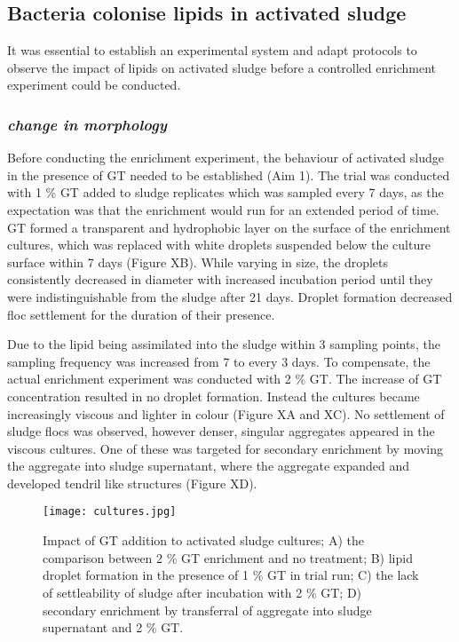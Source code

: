 \documentclass[11pt]{article}
\begin{document}
\subsection{Bacteria colonise lipids in activated sludge}
It was essential to establish an experimental system and adapt protocols to observe the impact of lipids on activated sludge before a controlled enrichment experiment could be conducted. 

\subsubsection{\emph{change in morphology}}
Before conducting the enrichment experiment, the behaviour of activated sludge in  the presence of GT needed to be established (Aim 1). The trial was conducted with 1 \% GT  added to sludge replicates which was sampled every 7 days, as the expectation was that the enrichment would run for an extended period of time. GT formed a transparent and hydrophobic layer on the surface of the enrichment cultures, which was replaced with white droplets suspended below the culture surface within 7 days (Figure XB). While varying in size, the droplets consistently decreased in diameter with increased incubation period until they were indistinguishable from the sludge after 21 days. Droplet formation decreased floc settlement for the duration of their presence. 


Due to the lipid being assimilated into the sludge within 3 sampling points, the sampling frequency was increased from 7 to every 3 days. To compensate, the actual enrichment experiment was conducted with 2 \% GT. The increase of GT concentration resulted in no droplet formation. Instead the cultures became increasingly viscous and lighter in colour (Figure XA and XC). No settlement of sludge flocs was observed, however denser, singular aggregates appeared in the viscous cultures. One of these was targeted for secondary enrichment by moving the aggregate into sludge supernatant, where the aggregate expanded and developed tendril like structures (Figure XD).

\begin{figure}
\texttt{[image: cultures.jpg]}
\caption{Impact of GT addition to activated sludge cultures; A) the comparison between 2 \% GT enrichment and no treatment; B) lipid droplet formation in the presence of 1 \% GT in trial run; C) the lack of settleability of sludge after incubation with 2 \% GT; D) secondary enrichment by transferral of aggregate into sludge supernatant and 2 \% GT.}
\end{figure}
\FloatBarrier
\end{document}
